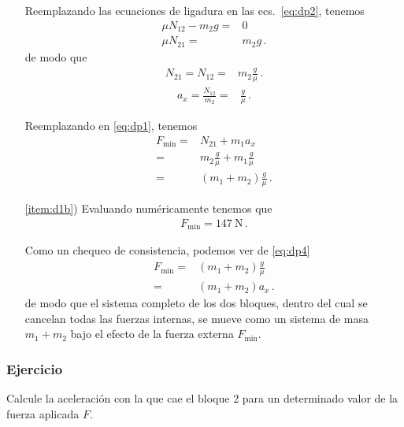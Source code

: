 \begin{frame}
\begin{itemize}
    Reemplazando las ecuaciones de ligadura en las ecs.~\eqref{eq:dp2}, tenemos
    \begin{align*}
      \mu N_{12}-m_2g=&0\nonumber\\
      \mu N_{21}=&m_2g\,.
    \end{align*}
    de modo que 
    \begin{align*}
    N_{21}=N_{12}=&m_2\frac{g}{\mu}\,.
    \end{align*}
    \begin{align*}
    a_x=\frac{N_{12}}{m_2}=&\frac{g}{\mu}\,.
    \end{align*}

    Reemplazando en \eqref{eq:dp1}, tenemos
    \begin{align}
      \label{eq:dp4}
      F_{\text{min}}=&N_{21}+m_1 a_x\nonumber\\
      =&m_2\frac{g}{\mu}+m_1 \frac{g}{\mu}\nonumber\\
      =&(m_1+m_2)\frac{g}{\mu}\,.
    \end{align}

    \item[\ref{item:d1b})] Evaluando numéricamente tenemos que
      \begin{align*}
        F_{\text{min}}=\SI{147}{\newton}\,.
      \end{align*}

      Como un chequeo de consistencia, podemos ver de \eqref{eq:dp4}
      \begin{align*}
        F_{\text{min}}=&(m_1+m_2)\frac{g}{\mu}\nonumber\\
        =&(m_1+m_2)a_x\,.
      \end{align*}
      de modo que el sistema completo de los dos bloques, dentro del
      cual se cancelan todas las fuerzas internas, se mueve como un
      sistema de masa $m_1+m_2$ bajo el efecto de la fuerza externa
      $F_{\text{min}}$.\finejemplo

\end{itemize}
\end{frame}
\subsubsection*{Ejercicio}
Calcule la aceleración con la que cae el bloque 2 para un determinado valor de la fuerza aplicada $F$.
\begin{extrapage}
  \newpage
  \qquad
  \newpage
\end{extrapage}

